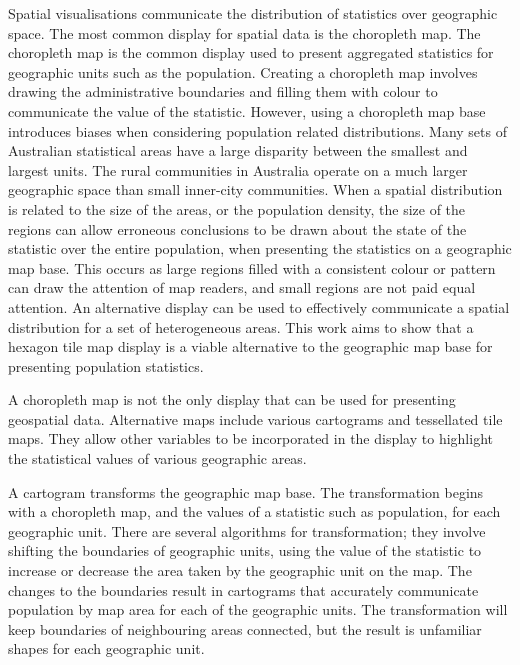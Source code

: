 \documentclass[conference,final,]{IEEEtran}
\begin{document}
Spatial visualisations communicate the distribution of statistics over
geographic space. The most common display for spatial data is the
choropleth map. The choropleth map is the common display used to present
aggregated statistics for geographic units such as the population.
Creating a choropleth map involves drawing the administrative boundaries
and filling them with colour to communicate the value of the statistic.
However, using a choropleth map base introduces biases when considering
population related distributions. Many sets of Australian statistical
areas have a large disparity between the smallest and largest units. The
rural communities in Australia operate on a much larger geographic space
than small inner-city communities. When a spatial distribution is
related to the size of the areas, or the population density, the size of
the regions can allow erroneous conclusions to be drawn about the state
of the statistic over the entire population, when presenting the
statistics on a geographic map base. This occurs as large regions filled
with a consistent colour or pattern can draw the attention of map
readers, and small regions are not paid equal attention. An alternative
display can be used to effectively communicate a spatial distribution
for a set of heterogeneous areas. This work aims to show that a hexagon
tile map display is a viable alternative to the geographic map base for
presenting population statistics.

A choropleth map is not the only display that can be used for presenting
geospatial data. Alternative maps include various cartograms and
tessellated tile maps. They allow other variables to be incorporated in
the display to highlight the statistical values of various geographic
areas.

A cartogram transforms the geographic map base. The transformation
begins with a choropleth map, and the values of a statistic such as
population, for each geographic unit. There are several algorithms for
transformation; they involve shifting the boundaries of geographic
units, using the value of the statistic to increase or decrease the area
taken by the geographic unit on the map. The changes to the boundaries
result in cartograms that accurately communicate population by map area
for each of the geographic units. The transformation will keep
boundaries of neighbouring areas connected, but the result is unfamiliar
shapes for each geographic unit.
\end{document}
